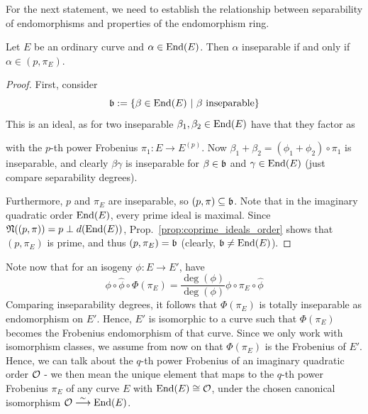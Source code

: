 For the next statement, we need to establish the relationship between separability of endomorphisms and properties of the endomorphism ring.
\begin{lemma}
    \label{prop:inseparable_iff_frobenius_ideal}
    Let $E$ be an ordinary curve and $\alpha \in \mathrm{End}(E)$.
    Then $\alpha$ inseparable if and only if $\alpha \in (p, \pi_E)$.
\end{lemma}
\begin{proof}
    First, consider
    \begin{equation*}
        \mathfrak{b} := \{ \beta \in \mathrm{End}(E) \ | \ \text{$\beta$ inseparable} \}
    \end{equation*}
    This is an ideal, as for two inseparable $\beta_1, \beta_2 \in \mathrm{End}(E)$ have that they factor as
    \begin{center}
    \end{center}
    with the $p$-th power Frobenius $\pi_1: E \to E^{(p)}$.
    Now $\beta_1 + \beta_2 = (\phi_1 + \phi_2) \circ \pi_1$ is inseparable, and clearly $\beta \gamma$ is inseparable for $\beta \in \mathfrak{b}$ and $\gamma \in \mathrm{End}(E)$ (just compare separability degrees).

    Furthermore, $p$ and $\pi_E$ are inseparable, so $(p, \pi) \subseteq \mathfrak{b}$.
    Note that in the imaginary quadratic order $\mathrm{End}(E)$, every prime ideal is maximal.
    Since $\mathfrak{N}((p, \pi)) = p \perp d(\mathrm{End}(E))$, Prop.~\ref{prop:coprime_ideals_order} shows that $(p, \pi_E)$ is prime, and thus $(p, \pi_E) = \mathfrak{b}$ (clearly, $\mathfrak{b} \neq \mathrm{End}(E)$).
\end{proof}
Note now that for an isogeny $\phi: E \to E'$, have
\begin{equation*}
    \phi \circ \hat{\phi} \circ \Phi(\pi_E) = \frac {\deg(\phi)} {\deg(\phi)} \phi \circ \pi_E \circ \hat{\phi}
\end{equation*}
Comparing inseparability degrees, it follows that $\Phi(\pi_E)$ is totally inseparable as endomorphism on $E'$.
Hence, $E'$ is isomorphic to a curve such that $\Phi(\pi_E)$ becomes the Frobenius endomorphism of that curve.
Since we only work with isomorphism classes, we assume from now on that $\Phi(\pi_E)$ is the Frobenius of $E'$.
Hence, we can talk about the $q$-th power Frobenius of an imaginary quadratic order $\mathcal{O}$ - we then mean the unique element that maps to the $q$-th power Frobenius $\pi_E$ of any curve $E$ with $\mathrm{End}(E) \cong \mathcal{O}$, under the chosen canonical isomorphism $\mathcal{O} \overset{\sim}{\longrightarrow} \mathrm{End}(E)$.

